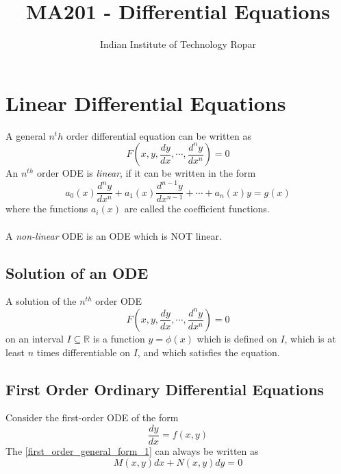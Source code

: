 \documentclass[oneside]{book}
\title{MA201 - Differential Equations}
\author{Indian Institute of Technology Ropar}
\begin{document}
\maketitle
{
	\hypersetup{
		hidelinks
	}
	\tableofcontents
}
\renewcommand{\arraystretch}{1.5}%

\chapter{Linear Differential Equations}
A general \(n^th\) order differential equation can be written as
\[
	F(x, y, \frac{dy}{dx}, \cdots, \frac{d^ny}{dx^n}) = 0
\]
An $n^{th}$ order ODE is \textit{linear}, if it can be written in the form
\[
	a_0(x)\frac{d^ny}{dx^n} + a_1(x)\frac{d^{n-1}y}{dx^{n-1}} + \cdots + a_n(x) y = g(x)
\]
where the functions \(a_i(x)\) are called the coefficient functions.
\\\\
\noindent A \textit{non-linear} ODE is an ODE which is NOT linear.

\section{Solution of an ODE}
A solution of the $n^{th}$ order ODE
\[
	F(x, y, \frac{dy}{dx}, \cdots, \frac{d^ny}{dx^n}) = 0
\]
on an interval \(I\subseteq \mathbb{R}\) is a function \(y = \phi(x)\) which is defined on $I$, which is at least $n$ times differentiable on $I$, and which satisfies the equation.

\section{First Order Ordinary Differential Equations}
Consider the first-order ODE of the form
\begin{equation}
	\frac{dy}{dx} = f(x, y)
	\label{first_order_general_form_1}
\end{equation}
The \cref{first_order_general_form_1} can always be written as
\begin{equation}
	M(x, y)dx + N(x, y)dy = 0
	\label{first_order_general_form_2}
\end{equation}
\end{document}
